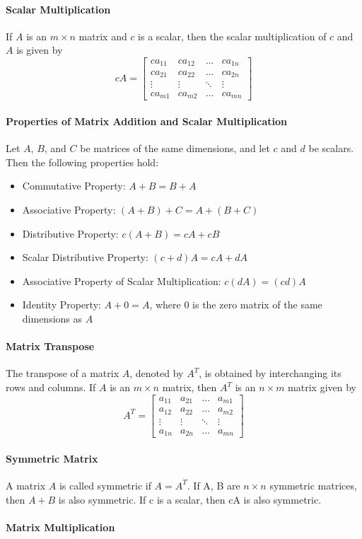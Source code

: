 \paragraph*{Scalar Multiplication} If $A$ is an $m \times n$ matrix and $c$ is a scalar, then the scalar multiplication of $c$ and $A$ is given by
\[cA = \begin{bmatrix}
    ca_{11} & ca_{12} & \ldots & ca_{1n} \\
    ca_{21} & ca_{22} & \ldots & ca_{2n} \\
    \vdots & \vdots & \ddots & \vdots \\
    ca_{m1} & ca_{m2} & \ldots & ca_{mn}
\end{bmatrix}\]

\paragraph*{Properties of Matrix Addition and Scalar Multiplication}
Let $A$, $B$, and $C$ be matrices of the same dimensions, and let $c$ and $d$ be scalars. Then the following properties hold:
\begin{itemize}
    \item Commutative Property: $A + B = B + A$
    \item Associative Property: $(A + B) + C = A + (B + C)$
    \item Distributive Property: $c(A + B) = cA + cB$
    \item Scalar Distributive Property: $(c + d)A = cA + dA$
    \item Associative Property of Scalar Multiplication: $c(dA) = (cd)A$
    \item Identity Property: $A + 0 = A$, where $0$ is the zero matrix of the same dimensions as $A$
\end{itemize}

\paragraph*{Matrix Transpose} The transpose of a matrix $A$, denoted by $A^T$, is obtained by interchanging its rows and columns. If $A$ is an $m \times n$ matrix, then $A^T$ is an $n \times m$ matrix given by
\[A^T = \begin{bmatrix}
    a_{11} & a_{21} & \ldots & a_{m1} \\
    a_{12} & a_{22} & \ldots & a_{m2} \\
    \vdots & \vdots & \ddots & \vdots \\
    a_{1n} & a_{2n} & \ldots & a_{mn}
\end{bmatrix}\]

\paragraph*{Symmetric Matrix} A matrix $A$ is called symmetric if $A = A^T$. If A, B are $n \times n$ symmetric matrices, then $A + B$ is also symmetric. If c is a scalar, then cA is also symmetric.

\paragraph*{Matrix Multiplication}